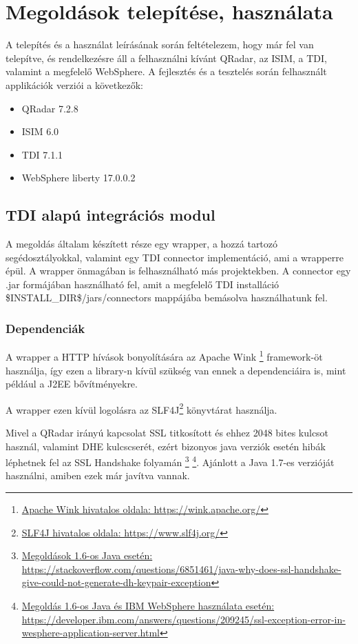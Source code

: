 \chapter{Megoldások telepítése, használata}
A telepítés és a használat leírásának során feltételezem, hogy már fel van telepítve, és rendelkezésre áll a felhasználni kívánt QRadar, az ISIM, a TDI, valamint a megfelelő WebSphere. A fejlesztés és a tesztelés során felhasznált applikációk verziói a következők:

\begin{itemize}
	\item QRadar 7.2.8
	\item ISIM 6.0
	\item TDI 7.1.1
	\item WebSphere liberty 17.0.0.2
\end{itemize}

\section{TDI alapú integrációs modul}
A megoldás általam készített része egy wrapper, a hozzá tartozó segédosztályokkal, valamint egy TDI connector implementáció, ami a wrapperre épül. A wrapper önmagában is felhasználható más projektekben. A connector egy .jar formájában használható fel, amit a megfelelő TDI installáció \$INSTALL\_DIR\$/jars/connectors mappájába bemásolva használhatunk fel. 
\subsection{Dependenciák}
A wrapper a HTTP hívások bonyolítására az Apache Wink \footnote{\href{https://wink.apache.org/}{Apache Wink hivatalos oldala: https://wink.apache.org/}} framework-öt használja, így ezen a library-n kívül szükség van ennek a dependenciáira is, mint például a J2EE bővítményekre.

A wrapper ezen kívül logolásra az SLF4J\footnote{\href{https://www.slf4j.org/}{SLF4J hivatalos oldala: https://www.slf4j.org/}} könyvtárat használja.

Mivel a QRadar irányú kapcsolat SSL titkosított és ehhez 2048 bites kulcsot használ, valamint DHE kulcscserét, ezért bizonyos java verziók esetén hibák léphetnek fel az SSL Handshake folyamán
\footnote{\href{https://stackoverflow.com/questions/6851461/java-why-does-ssl-handshake-give-could-not-generate-dh-keypair-exception}{Megoldások 1.6-os Java esetén: https://stackoverflow.com/questions/6851461/java-why-does-ssl-handshake-give-could-not-generate-dh-keypair-exception}} \footnote{\href{https://developer.ibm.com/answers/questions/209245/ssl-exception-error-in-wesphere-application-server.html}{Megoldás 1.6-os Java és IBM WebSphere használata esetén: https://developer.ibm.com/answers/questions/209245/ssl-exception-error-in-wesphere-application-server.html}}.
Ajánlott a Java 1.7-es verzióját használni, amiben ezek már javítva vannak.
